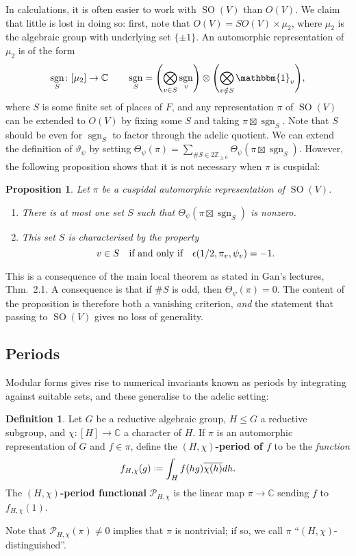 \documentclass[11pt,a4paper,leqno]{article}
\let\mc\mathcal
\newcommand{\1}{\mathbbm{1}}
\newcommand{\Z}{\mathbb{Z}}
\newcommand{\C}{\mathbb{C}}
\newcommand*{\defeq}{\mathrel{\vcenter{\baselineskip0.5ex \lineskiplimit0pt
      \hbox{\scriptsize.}\hbox{\scriptsize.}}}%
  =}
\renewcommand{\theta}{\vartheta}
\DeclareMathOperator{\sgn}{sgn}
\DeclareMathOperator{\SO}{SO}
\theoremstyle{plain}
\newtheorem{prop}[theorem]{Proposition}
\theoremstyle{definition}
\newtheorem{definition}[theorem]{Definition}
\theoremstyle{remark}
\numberwithin{equation}{section}
\begin{document}
In calculations, it is often easier to work with $\SO(V)$ than $O(V)$.
We claim that little is lost in doing so: first, note that
$O(V) = SO(V) \times \mu_{2}$, where $\mu_{2}$ is the algebraic group with
underlying set $\{\pm1\}$. An automorphic representation of $\mu_{2}$ is
of the form
\begin{equation}
  \label{eq:34}
\sgn_{S} \colon [\mu_{2}] \to \C \qq{} \sgn_{S} = \qty(\bigotimes_{v \in S}
\sgn_{v})\otimes \qty(\bigotimes_{v \notin S} \1_{v}),
\end{equation}
where $S$ is some finite set of places of $F$, and any representation
$\pi$ of $\SO(V)$ can be extended to $O(V)$ by fixing some $S$ and
taking $\pi \boxtimes \sgn_{S}$. Note that $S$ should be even for
$\sgn_{S}$ to factor through the adelic quotient. We can
extend the definition of $\theta_{\psi}$ by setting $\Theta_{\psi}(\pi) = \sum_{\# S \in 2
  \Z_{\ge 0}} \Theta_{\psi}(\pi \boxtimes \sgn_{S})$. However, the following proposition
shows that it is not necessary when $\pi$ is cuspidal:

\begin{prop}
  Let $\pi$ be a cuspidal automorphic representation of $\SO(V)$.
  \begin{enumerate}
  \item There is at most one set $S$ such that $\Theta_{\psi}(\pi \boxtimes \sgn_{S})$
    is nonzero.
  \item This set $S$ is characterised by the property
\begin{equation}
  \label{eq:31}
v \in S \qq{if and only if} \epsilon(1/2,\pi_{v}, \psi_{v}) = -1.
\end{equation}
  \end{enumerate}
\end{prop}
This is a consequence of the main local theorem as stated in Gan's
lectures, Thm.~2.1. A consequence is that if $\# S$ is odd, then
$\Theta_{\psi}(\pi) = 0$. The content of the proposition is therefore both a
vanishing criterion, \emph{and} the statement that passing to $\SO(V)$
gives no loss of generality.

\subsection{Periods}
\label{sec:periods}
Modular forms gives rise to numerical invariants known as periods
by integrating against suitable sets, and these generalise to the
adelic setting:
\begin{definition}
  Let $G$ be a reductive algebraic group, $H \le G$ a reductive subgroup,
  and $\chi \colon [H] \to \C$ a character of $H$. If $\pi$ is an automorphic
  representation of $G$ and $f \in \pi$, define the
  \textbf{$(H,\chi)$-period of $f$} to be the \emph{function}
  \begin{equation}
    \label{eq:33}
f_{H,\chi}(g) \defeq \int_{H}f(hg)\overline{\chi(h)}dh.
  \end{equation}
The \textbf{$(H,\chi)$-period functional} $\mc P_{H,\chi}$ is the linear map
$\pi \to \C$ sending $f$ to $f_{H,\chi}(1)$.
\end{definition}
Note that $\mc P_{H,\chi}(\pi) \ne 0$ implies that $\pi$ is nontrivial; if so,
we call $\pi$ ``$(H,\chi)$-distinguished''.
\end{document}
